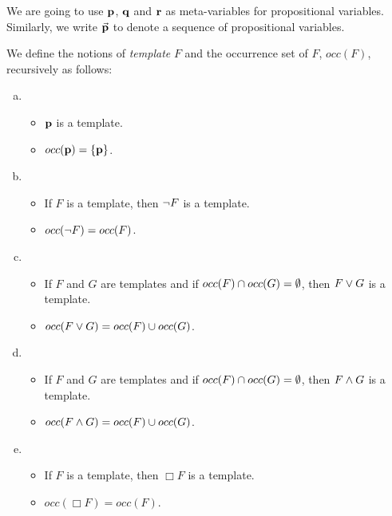 \qquad We are going to use $\textbf{p}$, $\textbf{q}$ and $\textbf{r}$ as meta-variables for propositional variables. Similarly, we write $\vec{\textbf{p}}$ to denote a sequence of propositional variables.

\begin{defn} 
	We define the notions of \textit{template} $F$ and the occurrence set of $F$, $occ(F)$, recursively as follows:
	
	\begin{enumerate}[a)]
		\item 
		\begin{itemize}
			\item $\textbf{p}$ is a template.
			\item $occ(\textbf{p}) = \{ \textbf{p} \}$.
		\end{itemize}
		
		
		
		\item 
		\begin{itemize}
			\item If $F$ is a template, then $\neg F$ is a template. 
			\item $occ(\neg F) = occ(F)$.
		\end{itemize}
		
		
		
		\item 
		\begin{itemize}
			\item If $F$ and $G$ are templates and if  $occ(F)\cap occ(G) =\emptyset$, then $F \vee G$ is a template. 
			\item $occ(F\vee G) = occ(F)\cup occ(G)$.
		\end{itemize}
		
		
		
		\item 
		\begin{itemize}
			\item If $F$ and $G$ are templates and if  $occ(F)\cap occ(G) =\emptyset$, then $F \wedge G$ is a template. 
			\item $occ(F\wedge G) = occ(F)\cup occ(G)$.
		\end{itemize}
		
		
		\item 
		\begin{itemize}
			\item If $F$ is a template, then $\Box F$ is a template. 
			\item $occ(\Box F) = occ(F)$.
		\end{itemize}
		
	\end{enumerate}
\end{defn}


